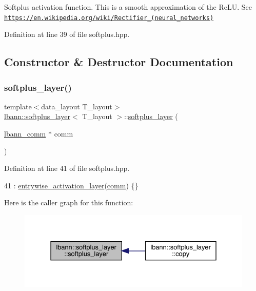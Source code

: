 Softplus activation function. This is a smooth approximation of the Re\+LU. See \href{https://en.wikipedia.org/wiki/Rectifier_(neural_networks)}{\tt https\+://en.\+wikipedia.\+org/wiki/\+Rectifier\+\_\+(neural\+\_\+networks)} 

Definition at line 39 of file softplus.\+hpp.



\subsection{Constructor \& Destructor Documentation}
\mbox{\label{classlbann_1_1softplus__layer_a5c80b19945ae94541bf5edb53b664c69}} 
\subsubsection{\texorpdfstring{softplus\+\_\+layer()}{softplus\_layer()}}
{\footnotesize\ttfamily template$<$data\+\_\+layout T\+\_\+layout$>$ \\
\hyperlink{classlbann_1_1softplus__layer}{lbann\+::softplus\+\_\+layer}$<$ T\+\_\+layout $>$\+::\hyperlink{classlbann_1_1softplus__layer}{softplus\+\_\+layer} (\begin{DoxyParamCaption}\item[{\hyperlink{classlbann_1_1lbann__comm}{lbann\+\_\+comm} $\ast$}]{comm }\end{DoxyParamCaption})\hspace{0.3cm}{\ttfamily [inline]}}



Definition at line 41 of file softplus.\+hpp.


\begin{DoxyCode}
41 : \hyperlink{classlbann_1_1entrywise__activation__layer_aada1d9200612dcd13259799ef327c557}{entrywise\_activation\_layer}(\hyperlink{file__io_8cpp_ab048c6f9fcbcfaa57ce68b00263dbebe}{comm}) \{\}
\end{DoxyCode}
Here is the caller graph for this function\+:\nopagebreak
\begin{figure}[H]
\begin{center}
\leavevmode
\includegraphics[width=331pt]{classlbann_1_1softplus__layer_a5c80b19945ae94541bf5edb53b664c69_icgraph}
\end{center}
\end{figure}


